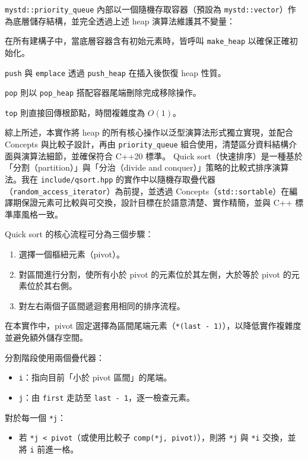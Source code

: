 \documentclass[a4paper,12pt]{article}
\begin{document}
\texttt{mystd::priority\_queue} 內部以一個隨機存取容器（預設為 \texttt{mystd::vector}）作為底層儲存結構，並完全透過上述 heap 演算法維護其不變量：
\bit
\item 在所有建構子中，當底層容器含有初始元素時，皆呼叫 \texttt{make\_heap} 以確保正確初始化。
\item \texttt{push} 與 \texttt{emplace} 透過 \texttt{push\_heap} 在插入後恢復 heap 性質。
\item \texttt{pop} 則以 \texttt{pop\_heap} 搭配容器尾端刪除完成移除操作。
\item \texttt{top} 則直接回傳根節點，時間複雜度為 $O(1)$。
\eit

綜上所述，本實作將 heap 的所有核心操作以泛型演算法形式獨立實現，並配合 Concepts 與比較子設計，再由 \texttt{priority\_queue} 組合使用，清楚區分資料結構介面與演算法細節，並確保符合 C++20 標準。
Quick sort（快速排序）是一種基於「分割（partition）」與「分治（divide and conquer）」策略的比較式排序演算法。我在 \verb|include/qsort.hpp| 的實作中以隨機存取疊代器（\texttt{random\_access\_iterator}）為前提，並透過 Concepts（\texttt{std::sortable}）在編譯期保證元素可比較與可交換，設計目標在於語意清楚、實作精簡，並與 C++ 標準庫風格一致。

Quick sort 的核心流程可分為三個步驟：
\begin{enumerate}
  \item 選擇一個樞紐元素（pivot）。
  \item 對區間進行分割，使所有小於 pivot 的元素位於其左側，大於等於 pivot 的元素位於其右側。
  \item 對左右兩個子區間遞迴套用相同的排序流程。
\end{enumerate}

在本實作中，pivot 固定選擇為區間尾端元素（\texttt{*(last - 1)}），以降低實作複雜度並避免額外儲存空間。

分割階段使用兩個疊代器：
\begin{itemize}
  \item \texttt{i}：指向目前「小於 pivot 區間」的尾端。
  \item \texttt{j}：由 \texttt{first} 走訪至 \texttt{last - 1}，逐一檢查元素。
\end{itemize}

對於每一個 \texttt{*j}：
\begin{itemize}
  \item 若 \texttt{*j < pivot}（或使用比較子 \texttt{comp(*j, pivot)}），則將 \texttt{*j} 與 \texttt{*i} 交換，並將 \texttt{i} 前進一格。
\end{itemize}
\end{document}
